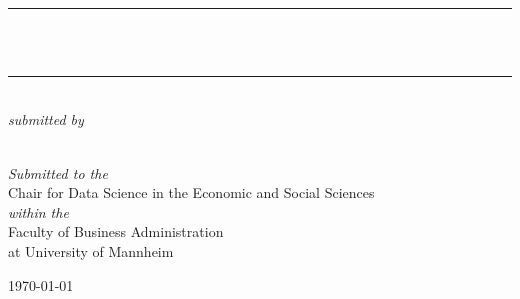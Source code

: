 %
%
%
% 
%

\begin{titlepage} %
\newcommand{\HRule}{\rule{\linewidth}{0.5mm}} %
\begin{center} %
\textsc{\LARGE \TypeofThesis}\\[1.5cm] %
\HRule\\[0.4cm]
{\huge\bfseries \TitleofThesis}\\[0.4cm] %
\HRule\\[1.5cm]
    \vfill
    \textit{\large submitted by}\\[0.5cm] %
\textsc{\Large \AuthorofThesis}\\[0.5cm] %
    \vfill

{\large\textit{Submitted to the}}\\
\Large Chair for Data Science in the Economic and Social Sciences \\
    {\large\textit{within the}}\\
    Faculty of Business Administration \\
    at University of Mannheim 
    
\vfill\vfill\vfill %
{\large\today} %


\end{center}
\end{titlepage}
